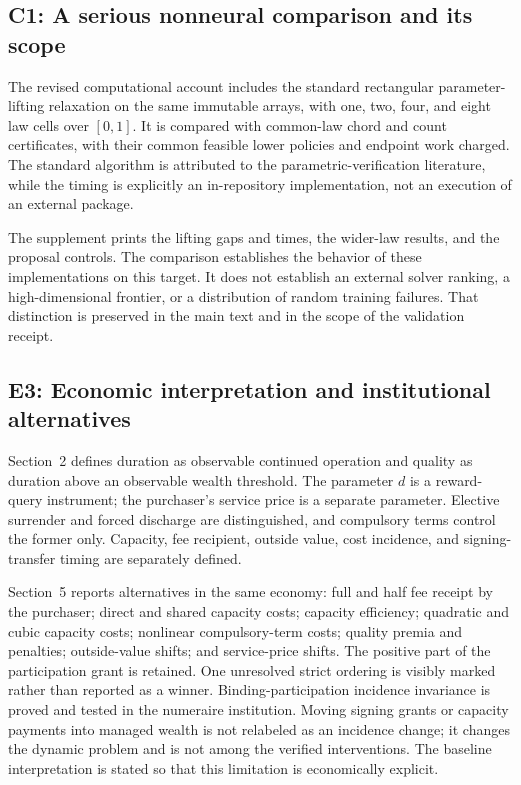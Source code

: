 \subsection{C1: A serious nonneural comparison and its scope}
The revised computational account includes the standard rectangular parameter-lifting relaxation on the same immutable arrays, with one, two, four, and eight law cells over $[0,1]$. It is compared with common-law chord and count certificates, with their common feasible lower policies and endpoint work charged. The standard algorithm is attributed to the parametric-verification literature, while the timing is explicitly an in-repository implementation, not an execution of an external package.

The supplement prints the lifting gaps and times, the wider-law results, and the proposal controls. The comparison establishes the behavior of these implementations on this target. It does not establish an external solver ranking, a high-dimensional frontier, or a distribution of random training failures. That distinction is preserved in the main text and in the scope of the validation receipt.

\subsection{E3: Economic interpretation and institutional alternatives}
Section~2 defines duration as observable continued operation and quality as duration above an observable wealth threshold. The parameter $d$ is a reward-query instrument; the purchaser's service price is a separate parameter. Elective surrender and forced discharge are distinguished, and compulsory terms control the former only. Capacity, fee recipient, outside value, cost incidence, and signing-transfer timing are separately defined.

Section~5 reports alternatives in the same economy: full and half fee receipt by the purchaser; direct and shared capacity costs; capacity efficiency; quadratic and cubic capacity costs; nonlinear compulsory-term costs; quality premia and penalties; outside-value shifts; and service-price shifts. The positive part of the participation grant is retained. One unresolved strict ordering is visibly marked rather than reported as a winner. Binding-participation incidence invariance is proved and tested in the numeraire institution. Moving signing grants or capacity payments into managed wealth is not relabeled as an incidence change; it changes the dynamic problem and is not among the verified interventions. The baseline interpretation is stated so that this limitation is economically explicit.

